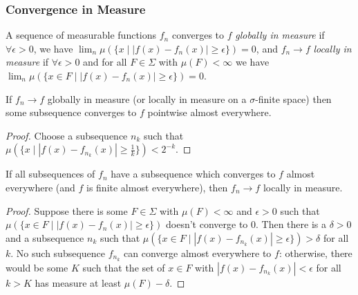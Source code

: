\subsubsection{Convergence in Measure}

\begin{defn} A sequence of measurable functions $f_n$ converges to $f$ \emph{globally in measure} if $\forall \epsilon > 0$, we have $\lim_n \mu(\{x \mid |f(x) - f_n(x)| \ge \epsilon\}) = 0$, and $f_n \rightarrow f$ \emph{locally in measure} if $\forall \epsilon > 0$ and for all $F \in \Sigma$ with $\mu(F) < \infty$ we have $\lim_n \mu(\{x \in F \mid |f(x) - f_n(x)| \ge \epsilon\}) = 0$.
\end{defn}

\begin{thm}[Riesz] If $f_n \rightarrow f$ globally in measure (or locally in measure on a $\sigma$-finite space) then some subsequence converges to $f$ pointwise almost everywhere.
\end{thm}
\begin{proof} Choose a subsequence $n_k$ such that $\mu(\{x \mid |f(x) - f_{n_k}(x)| \ge \frac{1}{k}\}) < 2^{-k}$.
\end{proof}

\begin{prop} If all subsequences of $f_n$ have a subsequence which converges to $f$ almost everywhere (and $f$ is finite almost everywhere), then $f_n \rightarrow f$ locally in measure.
\end{prop}
\begin{proof} Suppose there is some $F \in \Sigma$ with $\mu(F) < \infty$ and $\epsilon > 0$ such that $\mu(\{x \in F \mid |f(x) - f_n(x)| \ge \epsilon\})$ doesn't converge to $0$. Then there is a $\delta > 0$ and a subsequence $n_k$ such that $\mu(\{x \in F \mid |f(x) - f_{n_k}(x)| \ge \epsilon\}) > \delta$ for all $k$. No such subsequence $f_{n_k}$ can converge almost everywhere to $f$: otherwise, there would be some $K$ such that the set of $x \in F$ with $|f(x) - f_{n_k}(x)| < \epsilon$ for all $k > K$ has measure at least $\mu(F) - \delta$.
\end{proof}



